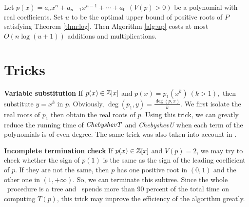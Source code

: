 \begin{corollary}
  Let $p(x)=a_nx^n+a_{n-1}x^{n-1}+\cdots+a_0$ $ (V(p)> 0)$ be a polynomial with real coefficients. Set $u$ to be the optimal upper bound of positive roots of $P$ satisfying Theorem
  \ref{thm:log}. Then  Algorithm \ref{alg:up} costs at most $O(n\log(u+1))$  additions and multiplications.
\end{corollary}


\section{Tricks}
{\bf Variable substitution}
If $p(x)\in {\mathbb Z}[x]$ and $p(x)=p_1(x^k)\ (k>1),$ then substitute $y=x^k$ in $p$. Obviously, $\deg(p_1,y)=\frac{\deg(p,x)}{k}$. We first isolate the real roots of $p_1$ then
obtain the real roots of $p$. Using this trick, we can greatly reduce the running time of ${\it ChebyshevT}$
and {\it ChebyshevU} when each term of the polynomials is of even degree. The same trick was also taken into account in \cite{johnson06}.

{\bf Incomplete termination check}
If $p(x)\in {\mathbb Z}[x]$ and $V(p)= 2$, we may try to check whether the sign of $p(1)$ is the same as the sign of the leading coefficient of $p$. If they are not the same, then $p$  has one positive root in $(0,1)$ and the other one in $(1,+\infty)$. So, we can terminate this subtree. Since the whole \froot\ procedure is a tree and \froot\ spends more than 90 percent of the
total time on computing $T(p)$, this trick may improve the efficiency of the algorithm greatly.

